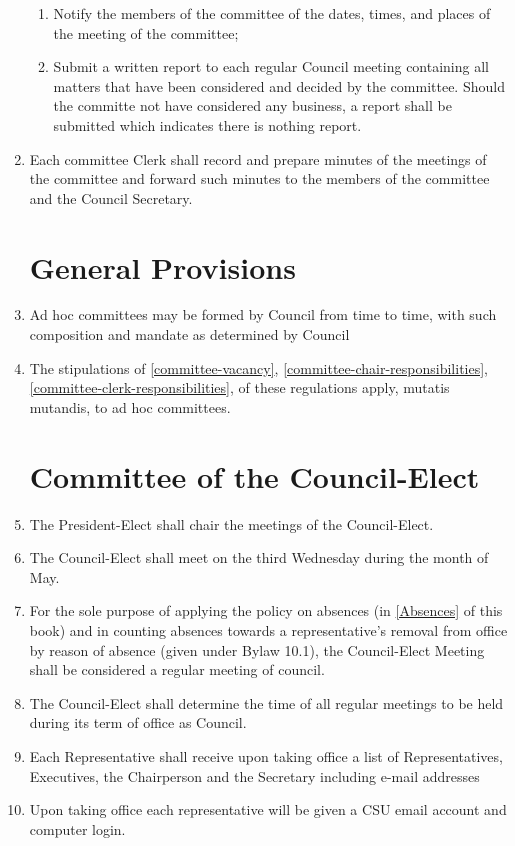 \documentclass[oneside]{book}
\begin{document}
\begin{enumerate}
\begin{enumerate}
\item Notify the members of the committee of the dates, times, and places
of the meeting of the committee; 
\item Submit a written report to each regular Council meeting containing all matters that have
been considered and decided by the committee. Should the committe not have considered any business, a report shall be submitted which indicates there is nothing report. 
\end{enumerate}
\item \label{committee-clerk-responsibilities} Each committee Clerk shall record and prepare minutes of the meetings
of the committee and forward such minutes to the members of the committee
and the Council Secretary. 

\section{\label{Committees_General_Provisions}General Provisions }
\item Ad hoc committees may be formed by Council from time to time, with
such composition and mandate as determined by Council 
\item The stipulations of \autoref{committee-vacancy}, \autoref{committee-chair-responsibilities}, \autoref{committee-clerk-responsibilities}, of these regulations apply,
mutatis mutandis, to ad hoc committees. 

\section{\label{Committee_of_the_Council-Elect}Committee of the Council-Elect }
\item The President-Elect shall chair the meetings of the Council-Elect. 
\item The Council-Elect shall meet on the third Wednesday during the month
of May. 
\item For the sole purpose of applying the policy on absences (in \autoref{Absences} of this book) and in counting absences towards a representative's removal from office by reason of absence (given under Bylaw 10.1), the Council-Elect Meeting shall be considered a regular meeting of council.
\item The Council-Elect shall determine the time of all regular meetings
to be held during its term of office as Council. 
\item Each Representative shall receive upon taking office a list of Representatives,
Executives, the Chairperson and the Secretary including e-mail addresses 
\item Upon taking office each representative will be given a CSU email account
and computer login. 


\end{enumerate}
\end{document}
